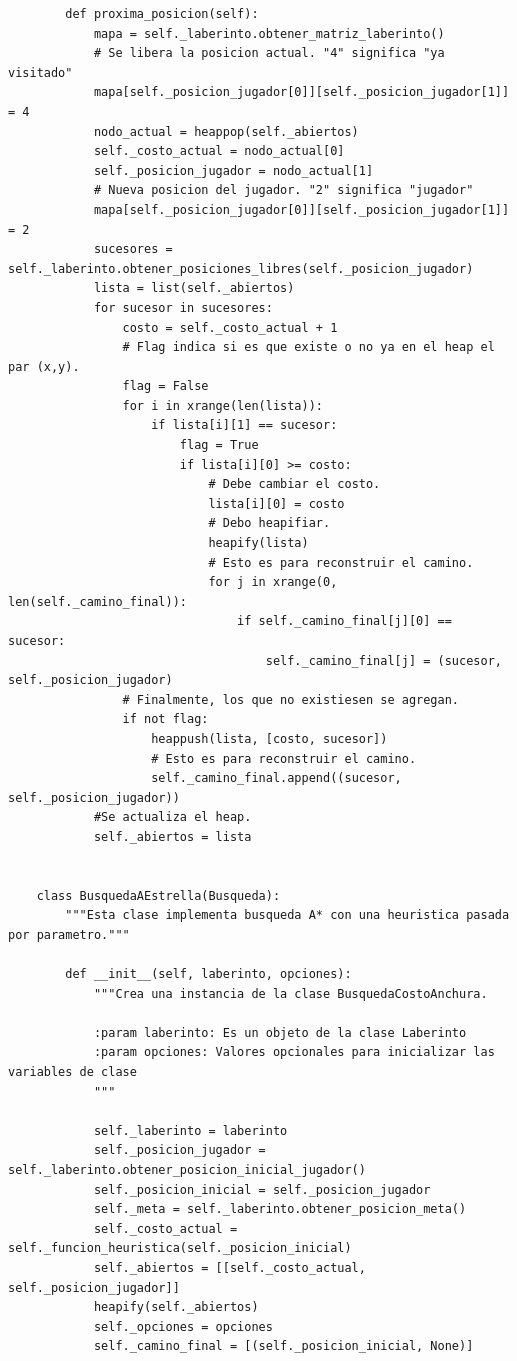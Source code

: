 \documentclass[letter, titlepage, 10pt]{article}
\begin{document}
\begin{lstlisting}
        def proxima_posicion(self):
            mapa = self._laberinto.obtener_matriz_laberinto()
            # Se libera la posicion actual. "4" significa "ya visitado"
            mapa[self._posicion_jugador[0]][self._posicion_jugador[1]] = 4
            nodo_actual = heappop(self._abiertos)
            self._costo_actual = nodo_actual[0]
            self._posicion_jugador = nodo_actual[1]
            # Nueva posicion del jugador. "2" significa "jugador"
            mapa[self._posicion_jugador[0]][self._posicion_jugador[1]] = 2
            sucesores = self._laberinto.obtener_posiciones_libres(self._posicion_jugador)
            lista = list(self._abiertos)
            for sucesor in sucesores:
                costo = self._costo_actual + 1
                # Flag indica si es que existe o no ya en el heap el par (x,y).
                flag = False
                for i in xrange(len(lista)):
                    if lista[i][1] == sucesor:
                        flag = True
                        if lista[i][0] >= costo:
                            # Debe cambiar el costo.
                            lista[i][0] = costo
                            # Debo heapifiar.
                            heapify(lista)
                            # Esto es para reconstruir el camino.
                            for j in xrange(0, len(self._camino_final)):
                                if self._camino_final[j][0] == sucesor:
                                    self._camino_final[j] = (sucesor, self._posicion_jugador)
                # Finalmente, los que no existiesen se agregan.
                if not flag:
                    heappush(lista, [costo, sucesor])
                    # Esto es para reconstruir el camino.
                    self._camino_final.append((sucesor, self._posicion_jugador))
            #Se actualiza el heap.
            self._abiertos = lista
    
    
    class BusquedaAEstrella(Busqueda):
        """Esta clase implementa busqueda A* con una heuristica pasada por parametro."""
    
        def __init__(self, laberinto, opciones):
            """Crea una instancia de la clase BusquedaCostoAnchura.
    
            :param laberinto: Es un objeto de la clase Laberinto
            :param opciones: Valores opcionales para inicializar las variables de clase
            """
    
            self._laberinto = laberinto
            self._posicion_jugador = self._laberinto.obtener_posicion_inicial_jugador()
            self._posicion_inicial = self._posicion_jugador
            self._meta = self._laberinto.obtener_posicion_meta()
            self._costo_actual = self._funcion_heuristica(self._posicion_inicial)
            self._abiertos = [[self._costo_actual, self._posicion_jugador]]
            heapify(self._abiertos)
            self._opciones = opciones
            self._camino_final = [(self._posicion_inicial, None)]
    

\end{lstlisting}
\end{document}
